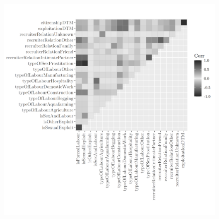 \documentclass{article} %
\begin{document}
\FloatBarrier
\begin{figure}[H]
	\includegraphics[width = \textwidth]{CorrPlot}
\end{figure}
\FloatBarrier





\printbibliography
\end{document}
